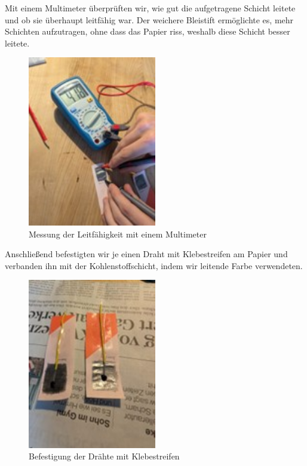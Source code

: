 \documentclass[a4paper,12pt]{article}
\begin{document}
Mit einem Multimeter überprüften wir, wie gut die aufgetragene Schicht leitete und ob sie überhaupt leitfähig war. Der weichere Bleistift ermöglichte es, mehr Schichten aufzutragen, ohne dass das Papier riss, weshalb diese Schicht besser leitete.

\begin{figure}[h!]
\centering
\includegraphics[width=0.5\textwidth]{Bild2} %
\caption{Messung der Leitfähigkeit mit einem Multimeter}
\label{fig:bild2}
\end{figure}

Anschließend befestigten wir je einen Draht mit Klebestreifen am Papier und verbanden ihn mit der Kohlenstoffschicht, indem wir leitende Farbe verwendeten.

\begin{figure}[h!]
\centering
\includegraphics[width=0.5\textwidth]{Bild3} %
\caption{Befestigung der Drähte mit Klebestreifen}
\label{fig:bild3}
\end{figure}
\end{document}
